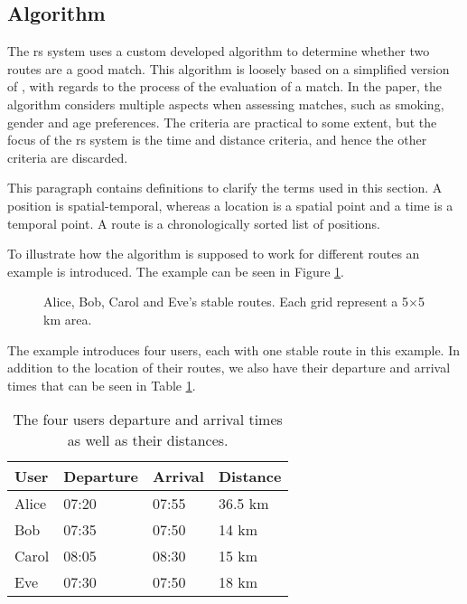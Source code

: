 \subsection{Algorithm}\label{ssec:algorithm}
The \gls{rs} system uses a custom developed algorithm to determine whether two routes are a good match.
This algorithm is loosely based on a simplified version of \citet{ghoseiri2011real}, with regards to the process of the evaluation of a match.
In the paper, the algorithm considers multiple aspects when assessing matches, such as smoking, gender and age preferences.
The criteria are practical to some extent, but the focus of the \gls{rs} system is the time and distance criteria, and hence the other criteria are discarded.

This paragraph contains definitions to clarify the terms used in this section. A position is spatial-temporal, whereas a location is a spatial point and a time is a temporal point.
A route is a chronologically sorted list of positions.

To illustrate how the algorithm is supposed to work for different routes an example is introduced. The example can be seen in Figure \ref{fig:algEx1}.
\begin{figure}[!ht]
    \centering

    \caption{Alice, Bob, Carol and Eve's stable routes. Each grid represent a 5$\times$5 km area.}
    \label{fig:algEx1}
\end{figure}
The example introduces four users, each with one stable route in this example. In addition to the location of their routes, we also have their departure and arrival times that can be seen in Table \ref{timetable}.
\begin{table}[]
\centering
\begin{tabular}{@{}llll@{}}
\toprule
\textbf{User} & \textbf{Departure} & \textbf{Arrival} & \textbf{Distance} 	\\ \midrule
Alice         & 07:20                   & 07:55       & 36.5 km 			\\
Bob           & 07:35                   & 07:50       & 14 km  		  		\\
Carol         & 08:05                   & 08:30       & 15 km         		\\
Eve           & 07:30                   & 07:50       & 18 km         		\\ \bottomrule
\end{tabular}
\caption{The four users departure and arrival times as well as their distances.}
\label{timetable}
\end{table}

